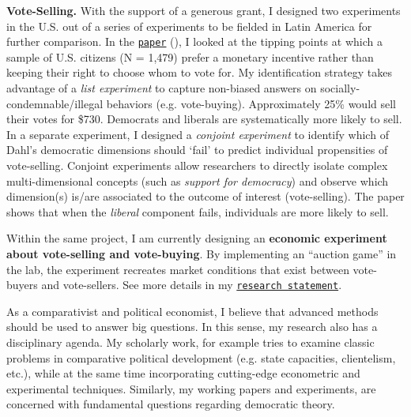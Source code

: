 {\bf Vote-Selling.} With the support of a generous grant, I designed two experiments in the U.S. out of a series of experiments to be fielded in Latin America for further comparison. In the \href{https://github.com/hbahamonde/Vote_Selling/raw/master/Bahamonde_VoteSellingUS.pdf}{\texttt{paper}} (\emph{\unskip}), I looked at the tipping points at which a sample of U.S. citizens (N = 1,479) prefer a monetary incentive rather than keeping their right to choose whom to vote for. My identification strategy takes advantage of a \emph{list experiment} to capture non-biased answers on socially-condemnable/illegal behaviors (e.g. vote-buying). Approximately 25\% would sell their votes for \$730. Democrats and liberals are systematically more likely to sell. In a separate experiment, I designed a \emph{conjoint experiment} to identify which of Dahl's democratic dimensions should `fail' to predict individual propensities of vote-selling. Conjoint experiments allow researchers to directly isolate complex multi-dimensional concepts (such as \emph{support for democracy}) and observe which dimension(s) is/are associated to the outcome of interest (vote-selling). The paper shows that when the \emph{liberal} component fails, individuals are more likely to sell. 

Within the same project, I am currently designing an {\bf economic experiment about vote-selling and vote-buying}. By implementing an ``auction game'' in the lab, the experiment recreates market conditions that exist between vote-buyers and vote-sellers. See more details in my \href{http://github.com/hbahamonde/Job_Market/raw/master/Bahamonde_Research_Statement.pdf}{\texttt{research statement}}.


As a comparativist and political economist, I believe that advanced methods should be used to answer big questions. In this sense, my research also has a disciplinary agenda. My scholarly work, for example tries to examine classic problems in comparative political development (e.g. state capacities, clientelism, etc.), while at the same time incorporating cutting-edge econometric and experimental techniques. Similarly, my working papers and experiments, are concerned with fundamental questions regarding democratic theory.